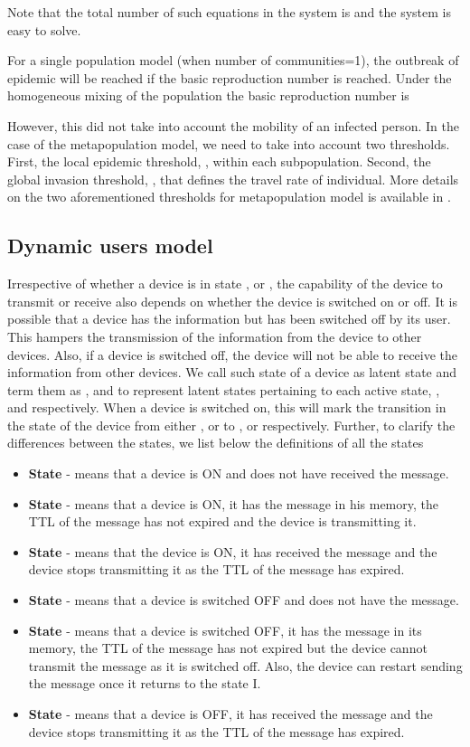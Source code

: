 \documentclass[review]{elsarticle}
\begin{document}
Note that the total number of such equations in the system is  and the system is easy to solve.

For a single population model (when number of communities=1), the outbreak of epidemic will be reached if the basic reproduction number  is reached. Under the homogeneous mixing of the population the basic reproduction number is

However, this did not take into account the mobility of an infected person. In the case of the metapopulation model, we need to take into account two thresholds. First, the local epidemic threshold, , within each subpopulation. Second, the global invasion threshold, , that defines the travel rate of individual. More details on the two aforementioned thresholds for metapopulation model is available in \cite{24418011}.

\subsection{Dynamic users model}\label{subsec:latent}

Irrespective of whether a device is in state ,  or , the capability of the device to transmit or receive also depends on whether the device is switched on or off. It is possible that a device has the information but has been switched off by its user. This hampers the transmission of the information from the device to other devices. Also, if a device is switched off, the device will not be able to receive the information from other devices. We call such state of a device as latent state and term them as ,  and  to represent latent states pertaining to each active state, ,  and  respectively. When a device is switched on, this will mark the transition in the state of the device from either ,  or  to ,  or  respectively. Further, to clarify the differences between the states, we list below the definitions of all the states

\begin{itemize}
\item \textbf{State } - means that a device is ON and does not have received the message.
\item  \textbf{State } - means that a device is ON, it has the message in his memory, the TTL of the message has not expired and the device is transmitting it.
\item \textbf{State } - means that the device is ON, it has received the message and the device stops transmitting it as the TTL of the message has expired.
\item \textbf{State } - means that a device is switched OFF and does not have the message.
\item \textbf{State } - means that a device is switched OFF, it has the message in its memory, the TTL of the message has not expired but the device cannot transmit the message as it is switched off. Also, the device can restart sending the message once it returns to the state I.
\item \textbf{State } - means that a device is OFF, it has received the message and the device stops transmitting it as the TTL of the message has expired.
\end{itemize}
\end{document}
